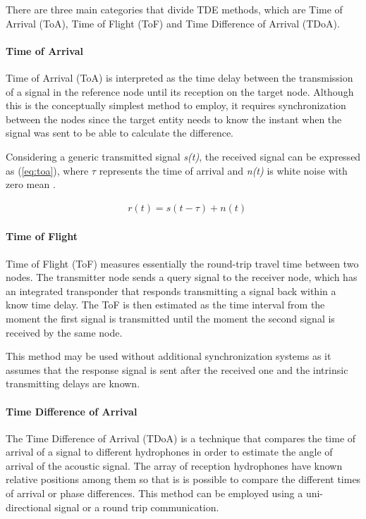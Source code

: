 There are three main categories that divide TDE methods, which are Time of Arrival (ToA), Time of Flight (ToF) and  Time Difference of Arrival (TDoA).

\paragraph{Time of Arrival}

Time of Arrival (ToA) is interpreted as the time delay between the transmission of a signal in the reference node until its reception on the target node. Although this is the conceptually simplest method to employ, it requires synchronization between the nodes since the target entity needs to know the instant when the signal was sent to be able to calculate the difference.

Considering a generic transmitted signal \textit{s(t)}, the received signal can be expressed as (\ref{eq:toa}), where $\tau$ represents the time of arrival and \textit{n(t)} is white noise with zero mean \cite{wirelesscomm}. 

\begin{eqnarray}
& r(t) = s(t - \tau) + n(t)
\label{eq:toa}
\end{eqnarray}

\paragraph{Time of Flight}

Time of Flight (ToF) measures essentially the round-trip travel time between two nodes. The transmitter node sends a query signal to the receiver node, which has an integrated transponder that responds transmitting a signal back within a know time delay. The ToF is then estimated as the time interval from the moment the first signal is transmitted until the moment the second signal is received by the same node. 

This method may be used without additional synchronization systems as it assumes that the response signal is sent after the received one and the intrinsic transmitting delays are known.

\paragraph{Time Difference of Arrival}

The Time Difference of Arrival (TDoA) is a technique that compares the time of arrival of a signal to different hydrophones in order to estimate the angle of arrival of the acoustic signal. The array of reception hydrophones have known relative positions among them so that is is possible to compare the different times of arrival or phase differences. This method can be employed using a uni-directional signal or a round trip communication.

